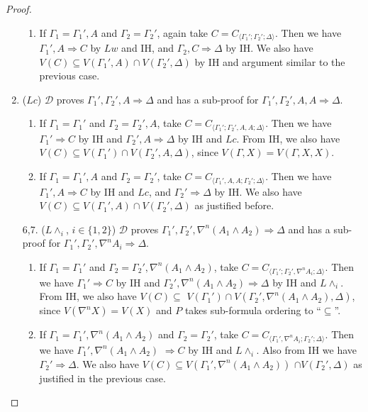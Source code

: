 \documentclass[12pt,a4paper]{article}
\theoremstyle{plain}
\theoremstyle{definition}
\begin{document}
\begin{proof}
\begin{enumerate}
\begin{enumerate}
		\item If $\Gamma_1 = \Gamma_1' , A$ and $\Gamma_2 = \Gamma_2'$, again take $C = C_{\langle\Gamma_1';\Gamma_2';\Delta\rangle}$. Then we have  $\Gamma_1' , A \Rightarrow C$ by $Lw$ and IH, and $\Gamma_2 , C \Rightarrow \Delta$ by IH. We also have $V(C) \subseteq V(\Gamma_1' , A) \cap V(\Gamma_2' , \Delta)$ by IH and argument similar to the previous case.
	\end{enumerate}

	\item ($Lc$) $\mathcal{D}$ proves $\Gamma_1' , \Gamma_2' , A \Rightarrow \Delta$ and has a sub-proof for $\Gamma_1' , \Gamma_2' , A , A \Rightarrow \Delta$.
	\begin{enumerate}
		\item If $\Gamma_1 = \Gamma_1'$ and $\Gamma_2 = \Gamma_2' , A$, take $C = C_{\langle\Gamma_1';\Gamma_2',A,A;\Delta\rangle}$. Then we have $\Gamma_1' \Rightarrow C$ by IH and $\Gamma_2' , A \Rightarrow \Delta$ by IH and $Lc$. From IH, we also have $V(C) \subseteq V(\Gamma_1') \cap V(\Gamma_2',A,\Delta)$, since $V(\Gamma,X) = V(\Gamma,X,X)$.
		
		\item If $\Gamma_1 = \Gamma_1' , A$ and $\Gamma_2 = \Gamma_2'$, take $C = C_{\langle\Gamma_1',A,A;\Gamma_2';\Delta\rangle}$. Then we have $\Gamma_1' , A \Rightarrow C$ by IH and $Lc$, and $\Gamma_2' \Rightarrow \Delta$ by IH. We also have $V(C) \subseteq V(\Gamma_1',A) \cap V(\Gamma_2',\Delta)$ as justified before.
	\end{enumerate}

	\item[6,7.] ($L\land_i$, {\small$i \in \{1,2\}$}) $\mathcal{D}$ proves $\Gamma_1' , \Gamma_2' , \nabla^n (A_1 \land A_2) \Rightarrow \Delta$ and has a sub-proof for $\Gamma_1' , \Gamma_2' , \nabla^n A_i \Rightarrow \Delta$.
	\begin{enumerate}
		\item If $\Gamma_1 = \Gamma_1'$ and $\Gamma_2 = \Gamma_2' , \nabla^n (A_1 \land A_2)$, take $C = C_{\langle\Gamma_1';\Gamma_2',\nabla^n A_i;\Delta\rangle}$. Then we have $\Gamma_1' \Rightarrow C$ by IH and $\Gamma_2' , \nabla^n (A_1 \land A_2) \Rightarrow \Delta$ by IH and $L\land_i$. From IH, we also have $V(C) \subseteq$ $V(\Gamma_1') \cap V(\Gamma_2',\nabla^n(A_1 \land A_2),\Delta)$, since $V(\nabla^n X) = V(X)$ and $P$ takes sub-formula ordering to ``$\subseteq$''.
		
		\item If $\Gamma_1 = \Gamma_1' , \nabla^n (A_1 \land A_2)$ and $\Gamma_2 = \Gamma_2'$, take $C = C_{\langle\Gamma_1',\nabla^n A_i;\Gamma_2';\Delta\rangle}$. Then we have $\Gamma_1' , \nabla^n (A_1 \land A_2)$ $\Rightarrow C$ by IH and $L\land_i$. Also from IH we have $\Gamma_2' \Rightarrow \Delta$. We also have $V(C) \subseteq V(\Gamma_1',\nabla^n (A_1 \land A_2))$ $\cap V(\Gamma_2',\Delta)$ as justified in the previous case.
	\end{enumerate}
	\setcounter{enumi}{7}


\end{enumerate}
\end{proof}
\end{document}
